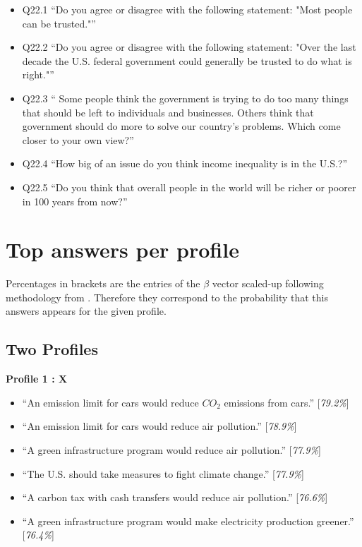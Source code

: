 \documentclass{article}
\begin{document}
\begin{itemize}
    \item Q22.1 ``Do you agree or disagree with the following statement: "Most people can be trusted."''
    \item Q22.2 ``Do you agree or disagree with the following statement: "Over the last decade the U.S. federal government could generally be trusted to do what is right."''
    \item Q22.3 `` Some people think the government is trying to do too many things that should be left to individuals and businesses. Others think that government should do more to solve our country's problems. Which come closer to your own view?''
    \item Q22.4 ``How big of an issue do you think income inequality is in the U.S.?''
    \item Q22.5 ``Do you think that overall people in the world will be richer or poorer in 100 years from now?''
\end{itemize}


\section{Top answers per profile}
Percentages in brackets are the entries of the $\beta$ vector scaled-up following methodology from \cite{draca2020polarized}. Therefore they correspond to the probability that this answers appears for the given profile.
\subsection{Two Profiles}

\textbf{Profile 1 : X}

\begin{itemize}
    \item ``An emission limit for cars would reduce $CO_2$ emissions from cars.'' [\textit{79.2\%}]
    \item ``An emission limit for cars would reduce air pollution.'' [\textit{78.9\%}]
    \item ``A green infrastructure program would reduce air pollution.'' [\textit{77.9\%}]
    \item ``The U.S. should take measures to fight climate change.'' [\textit{77.9\%}]
    \item ``A carbon tax with cash transfers would reduce air pollution.'' [\textit{76.6\%}]
    \item ``A green infrastructure program would make electricity production greener.'' [\textit{76.4\%}]
\end{itemize}
\end{document}
